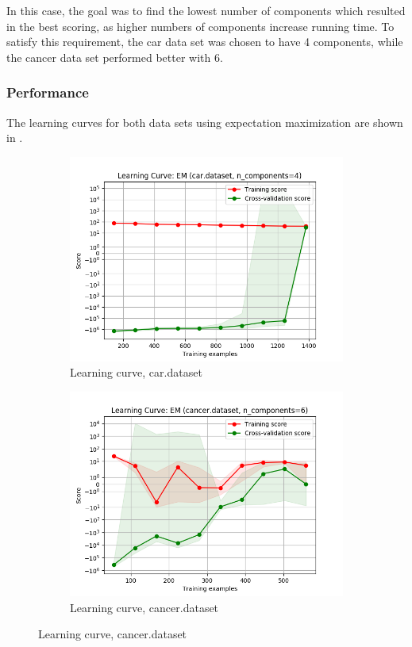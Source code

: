 \documentclass{article}
\begin{document}
        In this case, the goal was to find the lowest number of components which resulted in the best scoring, as higher numbers of components increase running time. To satisfy this requirement, the car data set was chosen to have 4 components, while the cancer data set performed better with 6.

      \subsubsection{Performance}
        The learning curves for both data sets using expectation maximization are shown in .

        \begin{figure}[htb]
        \centering

          \begin{subfigure}{0.4\textwidth}
            \includegraphics[width=\linewidth]{out/em/car-learning.png}
            \caption{Learning curve, car.dataset}
            \label{fig:em-learning-car}
          \end{subfigure}\hfil
          \begin{subfigure}{0.4\textwidth}
            \includegraphics[width=\linewidth]{out/em/cancer-learning.png}
            \caption{Learning curve, cancer.dataset}
            \label{fig:em-learning-cancer}
          \end{subfigure}


\end{figure}
\end{document}
